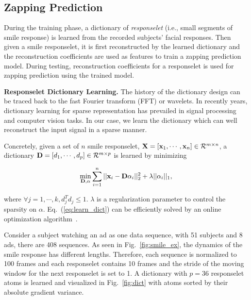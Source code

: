 \documentclass[10pt,journal,cspaper,compsoc]{IEEEtran}
\begin{document}
\subsection{Zapping Prediction}

During the training phase, a dictionary of \textit{responselet} (i.e., small segments of smile response) is learned from the recorded subjects' facial responses. Then given a smile responselet, it is first reconstructed by the learned dictionary and the reconstruction coefficients are used as features to train a zapping prediction model. During testing, reconstruction coefficients for a responselet is used for zapping prediction using the trained model. 

\noindent \textbf{Responselet Dictionary Learning.} The history of the dictionary design can be traced back to the fast Fourier transform (FFT) or wavelets. In recently years, dictionary learning for sparse representation has prevailed in signal processing and computer vision tasks. In our case, we learn the dictionary which can well reconstruct the input signal in a sparse manner. 

Concretely, given a set of $n$ smile responselet, ${\bf X}=[{\bf x}_1, \cdots, {\bf x}_n]\in \mathcal{R}^{m\times n}$, a dictionary ${\bf D}=[d_1,\cdots,d_p] \in \mathcal{R}^{m\times p}$ is learned by minimizing

\begin{align}
\label{eq:learn_dict}
\min_{\D , \alpha} \sum_{i=1}^n ||\x_i-\D\alpha_i||^2_2 +\lambda ||\alpha_i||_1,
\end{align}

\noindent where $\forall j=1,\cdots,k, d^T_j d_j \leq 1$. $\lambda$ is a regularization parameter to control the sparsity on $\alpha$. Eq.~(\ref{eq:learn_dict}) can be efficiently solved by an online optimization algorithm~\cite{spams}. 

Consider a subject watching an ad as one data sequence, with 51 subjects and 8 ads, there are 408 sequences. As seen in Fig.~\ref{fig:smile_ex}, the dynamics of the smile response has different lengths. Therefore, each sequence is normalized to 100 frames and each responselet contains 10 frames and the stride of the moving window for the next responselet is set to 1. A dictionary with $p=36$ responselet atoms is learned and visualized in Fig.~\ref{fig:dict} with atoms sorted by their absolute gradient variance. 
\end{document}
